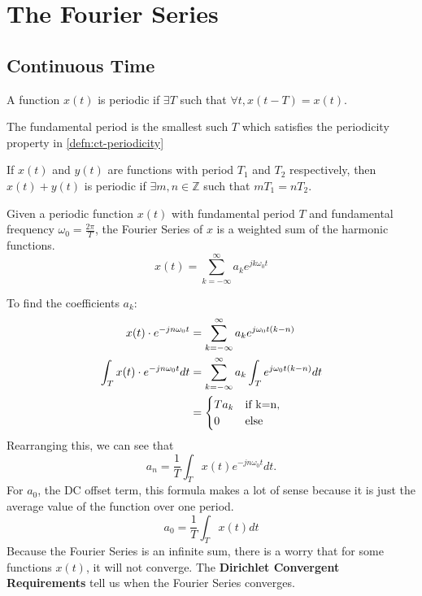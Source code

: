 \section{The Fourier Series}
\subsection{Continuous Time}
\begin{definition}
    A function $x(t)$ is periodic if $\exists T$ such that $\forall t, x(t-T)=x(t)$.
	\label{defn:ct-periodicity}
\end{definition}
\begin{definition}
  The fundamental period is the smallest such $T$ which satisfies the periodicity property in \cref{defn:ct-periodicity}
  \label{defn:fundamental-period}
\end{definition}
\begin{theorem}
    If $x(t)$ and $y(t)$ are functions with period $T_1$ and $T_2$ respectively, then $x(t)+y(t)$ is periodic
    if $\exists m, n \in \mathbb{Z}$ such that $mT_1 = nT_2$.
\end{theorem}
\begin{definition}
    Given a periodic function $x(t)$ with fundamental period $T$ and fundamental frequency $\omega_0=\frac{2\pi}{T}$,
    the Fourier Series of $x$ is a weighted sum of the harmonic functions.
    \[
	  x(t) = \sum_{k=-\infty}^{\infty}{a_ke^{jk\omega_0t}}
	\]
\end{definition}
To find the coefficients $a_k$:
\begin{align*}
  x(t) \cdot e^{-jn\omega_0t} &= \sum_{k=-\infty}^{\infty}{a_ke^{j\omega_0t(k-n)}}\\
  \int_{T}{x(t) \cdot e^{-jn\omega_0t}dt} &= \sum_{k=-\infty}^{\infty}{a_k\int_{T}{e^{j\omega_0t(k-n)}}dt}\\
  &= \begin{cases}
	Ta_k & \text{if } $k=n$,\\
	0 & \text{else }
  \end{cases}
\end{align*}
Rearranging this, we can see that
\[
  a_n = \frac{1}{T}\int_{T}{x(t)e^{-jn\omega_0t}dt}.
\]
For $a_0$, the DC offset term, this formula makes a lot of sense because it is just the average value of the function over one period.
\[
a_0 = \frac{1}{T}\int_{T}{x(t)dt}
\]
Because the Fourier Series is an infinite sum, there is a worry that for some functions $x(t)$, it will not converge.
The \textbf{Dirichlet Convergent Requirements} tell us when the Fourier Series converges.
